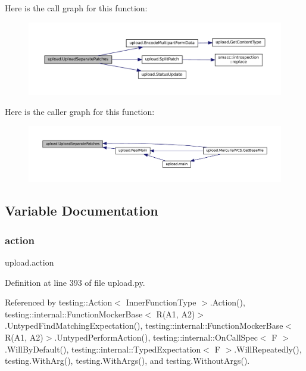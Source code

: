 Here is the call graph for this function\+:
\nopagebreak
\begin{figure}[H]
\begin{center}
\leavevmode
\includegraphics[width=350pt]{namespaceupload_a7ec83cb7f7bfb9109c19b6f91552b3ee_cgraph}
\end{center}
\end{figure}
Here is the caller graph for this function\+:
\nopagebreak
\begin{figure}[H]
\begin{center}
\leavevmode
\includegraphics[width=350pt]{namespaceupload_a7ec83cb7f7bfb9109c19b6f91552b3ee_icgraph}
\end{center}
\end{figure}


\subsection{Variable Documentation}
\mbox{\label{namespaceupload_a675d13c979f1c720866d22ed1736f580}} 
\subsubsection{\texorpdfstring{action}{action}}
{\footnotesize\ttfamily upload.\+action}



Definition at line 393 of file upload.\+py.



Referenced by testing\+::\+Action$<$ Inner\+Function\+Type $>$.\+Action(), testing\+::internal\+::\+Function\+Mocker\+Base$<$ R(\+A1, A2)$>$.\+Untyped\+Find\+Matching\+Expectation(), testing\+::internal\+::\+Function\+Mocker\+Base$<$ R(\+A1, A2)$>$.\+Untyped\+Perform\+Action(), testing\+::internal\+::\+On\+Call\+Spec$<$ F $>$.\+Will\+By\+Default(), testing\+::internal\+::\+Typed\+Expectation$<$ F $>$.\+Will\+Repeatedly(), testing.\+With\+Arg(), testing.\+With\+Args(), and testing.\+Without\+Args().

